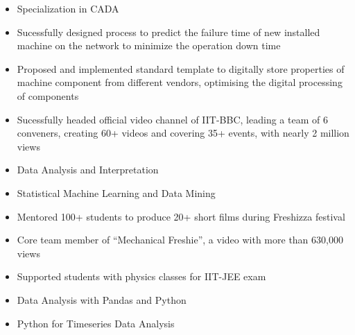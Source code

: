 \documentclass[10pt,a4paper,ragged2e,withhyper]{altacv}
\begin{document}
\begin{paracol}{2}
\newpage

\switchcolumn

\label{sec:orga515844}

\divider

\divider


\label{sec:org3250eca}
\begin{itemize}
\item Specialization in CADA
\item Sucessfully designed process to predict the failure time of new installed machine on the network to minimize the operation down time
\item Proposed and implemented standard template to digitally store properties of machine component from different vendors, optimising the digital processing of components
\end{itemize}

\divider
{}
\begin{itemize}
\item Sucessfully headed official video channel of IIT-BBC, leading a team of 6 conveners, creating 60+ videos and covering 35+ events, with nearly 2 million views
\item Data Analysis and Interpretation
\item Statistical Machine Learning and Data Mining
\end{itemize}



\label{sec:org029ad46}

\begin{itemize}
\item Mentored 100+ students to produce 20+ short films during Freshizza festival
\item Core team member of ``Mechanical Freshie'', a video with more than 630,000 views
\item Supported students with physics classes for IIT-JEE exam
\end{itemize}

\label{sec:orga9fa4ec}

\begin{itemize}
\item Data Analysis with Pandas and Python
\item Python for Timeseries Data Analysis
\end{itemize}

\end{paracol}
\end{document}
